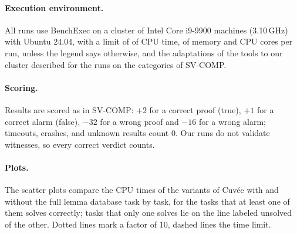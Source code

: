 \paragraph{Execution environment.}
All runs use BenchExec on a cluster of Intel Core i9-9900 machines (3.10\,GHz) with Ubuntu 24.04,
with a limit of \TimeLimit{} of CPU time, \MemoryLimit{} of memory and \Cores{} CPU cores per run,
unless the legend says otherwise, and the adaptations of the tools to our cluster described for the
runs on the categories of SV-COMP.

\paragraph{Scoring.}
Results are scored as in SV-COMP: $+2$ for a correct proof (true), $+1$ for a correct alarm
(false), $-32$ for a wrong proof and $-16$ for a wrong alarm; timeouts, crashes, and unknown results
count $0$. Our runs do not validate witnesses, so every correct verdict counts.

\paragraph{Plots.}
The
scatter plots compare the CPU times of the variants of Cuvée with and without the full lemma database
task by task, for the tasks that at least one of them solves correctly; tasks that only one solves lie
on the line labeled unsolved of the other. Dotted lines mark a factor of 10, dashed lines the time limit.
